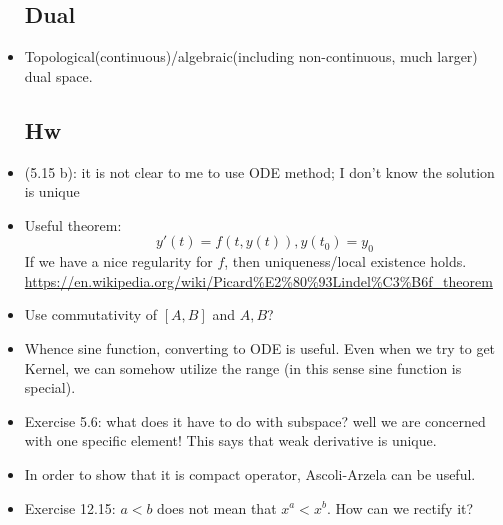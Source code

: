 \documentclass{article}
\theoremstyle{remark}
\begin{document}
\begin{itemize}
\subsection*{Dual}
\item Topological(continuous)/algebraic(including non-continuous, much larger) dual space.
\subsection*{Hw}
\item (5.15 b): it is not clear to me to use ODE method; I don't know the solution is unique
\item Useful theorem: 
$$y'(t)=f(t,y(t)), y(t_0)=y_0$$
If we have a nice regularity for $f$, then uniqueness/local existence holds.
\url{https://en.wikipedia.org/wiki/Picard%E2%80%93Lindel%C3%B6f_theorem}
\item Use commutativity of $[A,B]$ and $A,B$?
\item Whence sine function, converting to ODE is useful. Even when we try to get Kernel, we can somehow utilize the range (in this sense sine function is special).
\item Exercise 5.6: what does it have to do with subspace? well we are concerned with one specific element! This says that weak derivative is unique.
\item In order to show that it is compact operator, Ascoli-Arzela can be useful. 
\item Exercise 12.15: $a<b$ does not mean that $x^a<x^b$. How can we rectify it?

\end{itemize}
\end{document}
